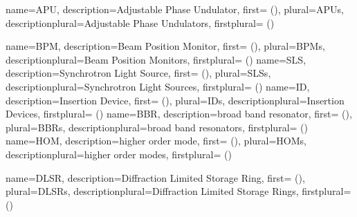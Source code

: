 

{
  name={APU},
  description={Adjustable Phase Undulator},
  first={ ()},
  plural={APUs},
  descriptionplural={Adjustable Phase Undulators},
  firstplural={ ()}
}

{
  name={BPM},
  description={Beam Position Monitor},
  first={ ()},
  plural={BPMs},
  descriptionplural={Beam Position Monitors},
  firstplural={ ()}
}
{
  name={SLS},
  description={Synchrotron Light Source},
  first={ ()},
  plural={SLSs},
  descriptionplural={Synchrotron Light Sources},
  firstplural={ ()}
}
{
  name={ID},
  description={Insertion Device},
  first={ ()},
  plural={IDs},
  descriptionplural={Insertion Devices},
  firstplural={ ()}
}
{
  name={BBR},
  description={broad band resonator},
  first={ ()},
  plural={BBRs},
  descriptionplural={broad band resonators},
  firstplural={ ()}
}
{
  name={HOM},
  description={higher order mode},
  first={ ()},
  plural={HOMs},
  descriptionplural={higher order modes},
  firstplural={ ()}
}

{
  name={DLSR},
  description={Diffraction Limited Storage Ring},
  first={ ()},
  plural={DLSRs},
  descriptionplural={Diffraction Limited Storage Rings},
  firstplural={ ()}
}
